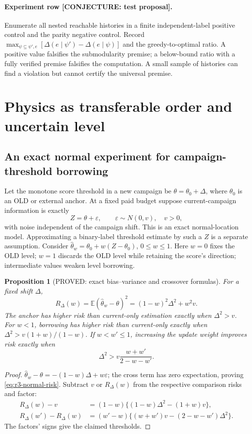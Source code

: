 \documentclass[11pt]{article}
\newcommand{\E}{\mathbb E}
\newtheorem{proposition}[theorem]{Proposition}
\theoremstyle{definition}
\theoremstyle{remark}
\begin{document}
\paragraph{Experiment row [CONJECTURE: test proposal].}
Enumerate all nested reachable histories in a finite independent-label
positive control and the parity negative control.  Record
$\max_{\psi\subseteq\psi',e}[\Delta(e\mid\psi')-\Delta(e\mid\psi)]$
and the greedy-to-optimal ratio.  A positive value falsifies the
submodularity premise; a below-bound ratio with a fully verified premise
falsifies the computation.  A small sample of histories can find a
violation but cannot certify the universal premise.

\section{Physics as transferable order and uncertain level}

\subsection{An exact normal experiment for campaign-threshold borrowing}

Let the monotone score threshold in a new campaign be
$\theta=\theta_0+\Delta$, where $\theta_0$ is an OLD or external anchor.
At a fixed paid budget suppose current-campaign information is exactly
\[
 Z=\theta+\varepsilon,\qquad \varepsilon\sim N(0,v),\quad v>0,
\]
with noise independent of the campaign shift.  This is an exact
normal-location model.  Approximating a binary-label threshold estimate
by such a $Z$ is a separate assumption.  Consider
$\widehat\theta_w=\theta_0+w(Z-\theta_0)$, $0\leq w\leq1$.
Here $w=0$ fixes the OLD level; $w=1$ discards the OLD level while retaining
the score's direction; intermediate values weaken level borrowing.

\begin{proposition}[PROVED: exact bias--variance and crossover formulas]
For a fixed shift $\Delta$,
\begin{equation}
 R_\Delta(w)=\E(\widehat\theta_w-\theta)^2
           =(1-w)^2\Delta^2+w^2v.
 \label{eq:r3-normal-risk}
\end{equation}
The anchor has higher risk than current-only estimation exactly when
$\Delta^2>v$.  For $w<1$, borrowing has higher risk than current-only
exactly when $\Delta^2>v(1+w)/(1-w)$.  If $w<w'\leq1$, increasing the
update weight improves risk exactly when
\[
 \Delta^2>v\frac{w+w'}{2-w-w'}.
\]
\end{proposition}
\begin{proof}
$\widehat\theta_w-\theta=-(1-w)\Delta+w\varepsilon$; the cross term has
zero expectation, proving \eqref{eq:r3-normal-risk}.  Subtract $v$ or
$R_\Delta(w)$ from the respective comparison risks and factor:
\begin{align*}
 R_\Delta(w)-v
 &=(1-w)\{(1-w)\Delta^2-(1+w)v\},\\
 R_\Delta(w')-R_\Delta(w)
 &=(w'-w)\{(w+w')v-(2-w-w')\Delta^2\}.
\end{align*}
The factors' signs give the claimed thresholds.
\end{proof}
\end{document}
